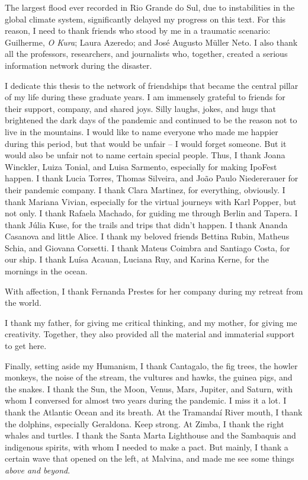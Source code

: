 \documentclass[./main_en.tex]{subfiles}
\begin{document}
\par The largest flood ever recorded in Rio Grande do Sul, due to instabilities in the global climate system, significantly delayed my progress on this text. For this reason, I need to thank friends who stood by me in a traumatic scenario: Guilherme, \textit{O Kura}; Laura Azeredo; and José Augusto Müller Neto. I also thank all the professors, researchers, and journalists who, together, created a serious information network during the disaster.

\par I dedicate this thesis to the network of friendships that became the central pillar of my life during these graduate years. I am immensely grateful to friends for their support, company, and shared joys. Silly laughs, jokes, and hugs that brightened the dark days of the pandemic and continued to be the reason not to live in the mountains. I would like to name everyone who made me happier during this period, but that would be unfair -- I would forget someone. But it would also be unfair not to name certain special people. Thus, I thank Joana Winckler, Luiza Tonial, and Luisa Sarmento, especially for making IpoFest happen. I thank Lucia Torres, Thomas Silveira, and João Paulo Niedererauer for their pandemic company. I thank Clara Martinez, for everything, obviously. I thank Mariana Vivian, especially for the virtual journeys with Karl Popper, but not only. I thank Rafaela Machado, for guiding me through Berlin and Tapera. I thank Júlia Kuse, for the trails and trips that didn’t happen. I thank Ananda Casanova and little Alice. I thank my beloved friends Bettina Rubin, Matheus Schia, and Giovana Corsetti. I thank Mateus Coimbra and Santiago Costa, for our ship. I thank Luísa Acauan, Luciana Ruy, and Karina Kerne, for the mornings in the ocean.

\par With affection, I thank Fernanda Prestes for her company during my retreat from the world.

\par I thank my father, for giving me critical thinking, and my mother, for giving me creativity. Together, they also provided all the material and immaterial support to get here.

\par Finally, setting aside my Humanism, I thank Cantagalo, the fig trees, the howler monkeys, the noise of the stream, the vultures and hawks, the guinea pigs, and the snakes. I thank the Sun, the Moon, Venus, Mars, Jupiter, and Saturn, with whom I conversed for almost two years during the pandemic. I miss it a lot. I thank the Atlantic Ocean and its breath. At the Tramandaí River mouth, I thank the dolphins, especially Geraldona. Keep strong. At Zimba, I thank the right whales and turtles. I thank the Santa Marta Lighthouse and the Sambaquis and indigenous spirits, with whom I needed to make a pact. But mainly, I thank a certain wave that opened on the left, at Malvina, and made me see some things \textit{above and beyond}.


\clearpage
\end{document}
